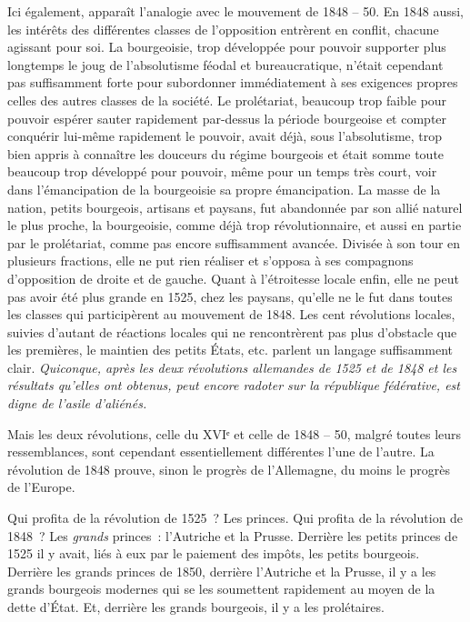 \documentclass[french,twoside]{book} %
\begin{document}
Ici également, apparaît l’analogie avec le mouvement de 1848 – 50. En 1848 aussi, les intérêts des différentes classes de l’opposition entrèrent en conflit, chacune agissant pour soi. La bourgeoisie, trop développée pour pouvoir supporter plus longtemps le joug de l’absolutisme féodal et bureaucratique, n’était cependant pas suffisamment forte pour subordonner immédiatement à ses exigences propres celles des autres classes de la société. Le prolétariat, beaucoup trop faible pour pouvoir espérer sauter rapidement par-dessus la période bourgeoise et compter conquérir lui-même rapidement le pouvoir, avait déjà, sous l’absolutisme, trop bien appris à connaître les douceurs du régime bourgeois et était somme toute beaucoup trop développé pour pouvoir, même pour un temps très court, voir dans l’émancipation de la bourgeoisie sa propre émancipation. La masse de la nation, petits bourgeois, artisans et paysans, fut abandonnée par son allié naturel le plus proche, la bourgeoisie, comme déjà trop révolutionnaire, et aussi en partie par le prolétariat, comme pas encore suffisamment avancée. Divisée à son tour en plusieurs fractions, elle ne put rien réaliser et s’opposa à ses compagnons d’opposition de droite et de gauche. Quant à l’étroitesse locale enfin, elle ne peut pas avoir été plus grande en 1525, chez les paysans, qu’elle ne le fut dans toutes les classes qui participèrent au mouvement de 1848. Les cent révolutions locales, suivies d’autant de réactions locales qui ne rencontrèrent pas plus d’obstacle que les premières, le maintien des petits États, etc. parlent un langage suffisamment clair. \emph{Quiconque, après les deux révolutions allemandes de 1525 et de 1848 et les résultats qu’elles ont obtenus, peut encore radoter sur la république fédérative, est digne de l’asile d’aliénés.}\par
Mais les deux révolutions, celle du XVIᵉ et celle de 1848 – 50, malgré toutes leurs ressemblances, sont cependant essentiellement différentes l’une de l’autre. La révolution de 1848 prouve, sinon le progrès de l’Allemagne, du moins le progrès de l’Europe.\par
Qui profita de la révolution de 1525 ? Les princes. Qui profita de la révolution de 1848 ? Les \emph{grands} princes : l’Autriche et la Prusse. Derrière les petits princes de 1525 il y avait, liés à eux par le paiement des impôts, les petits bourgeois. Derrière les grands princes de 1850, derrière l’Autriche et la Prusse, il y a les grands bourgeois modernes qui se les soumettent rapidement au moyen de la dette d’État. Et, derrière les grands bourgeois, il y a les prolétaires.\par
\end{document}
